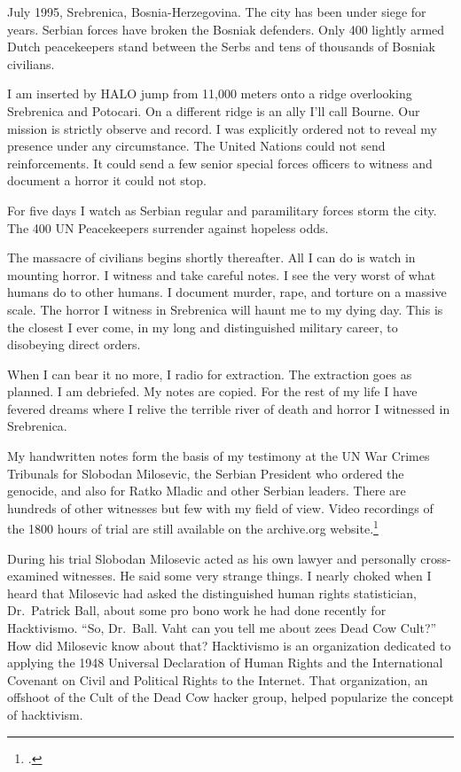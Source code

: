 \vspace{0.5cm}

July 1995, Srebrenica, Bosnia-Herzegovina. The city has been under siege for years. Serbian forces have broken the Bosniak defenders. Only 400 lightly armed Dutch peacekeepers stand between the Serbs and tens of thousands of Bosniak civilians.

I am inserted by HALO jump from 11,000 meters onto a ridge overlooking Srebrenica and Potocari. On a different ridge is an ally I'll call Bourne. Our mission is strictly observe and record. I was explicitly ordered not to reveal my presence under any circumstance. The United Nations could not send reinforcements. It could send a few senior special forces officers to witness and document a horror it could not stop.

For five days I watch as Serbian regular and paramilitary forces storm the city. The 400 UN Peacekeepers surrender against hopeless odds.

The massacre of civilians begins shortly thereafter. All I can do is watch in mounting horror. I witness and take careful notes. I see the very worst of what humans do to other humans. I document murder, rape, and torture on a massive scale. The horror I witness in Srebrenica will haunt me to my dying day. This is the closest I ever come, in my long and distinguished military career, to disobeying direct orders.

When I can bear it no more, I radio for extraction. The extraction goes as planned. I am debriefed. My notes are copied. For the rest of my life I have fevered dreams where I relive the terrible river of death and horror I witnessed in Srebrenica.

My handwritten notes form the basis of my testimony at the UN War Crimes Tribunals for Slobodan Milosevic, the Serbian President who ordered the genocide, and also for Ratko Mladic and other Serbian leaders. There are hundreds of other witnesses but few with my field of view. Video recordings of the 1800 hours of trial are still available on the archive.org website.\footcite{milosevicarchive}

During his trial Slobodan Milosevic acted as his own lawyer and personally cross-examined witnesses. He said some very strange things. I nearly choked when I heard that Milosevic had asked the distinguished human rights statistician, Dr.\ Patrick Ball, about some pro bono work he had done recently for Hacktivismo. ``So, Dr.\ Ball. Vaht can you tell me about zees Dead Cow Cult?'' How did Milosevic know about that? Hacktivismo is an organization dedicated to applying the 1948 Universal Declaration of Human Rights and the International Covenant on Civil and Political Rights to the Internet. That organization, an offshoot of the Cult of the Dead Cow hacker group, helped popularize the concept of hacktivism.

